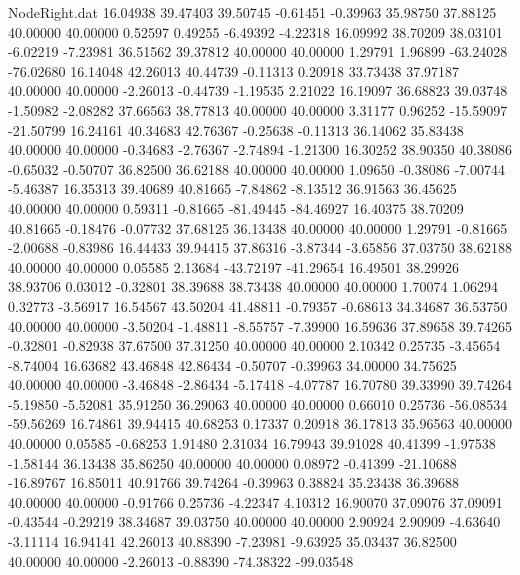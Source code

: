 \begin{filecontents}{NodeRight.dat}
  16.04938   39.47403   39.50745    -0.61451   -0.39963   35.98750   37.88125   40.00000   40.00000    0.52597    0.49255   -6.49392   -4.22318
  16.09992   38.70209   38.03101    -6.02219   -7.23981   36.51562   39.37812   40.00000   40.00000    1.29791    1.96899  -63.24028  -76.02680
  16.14048   42.26013   40.44739    -0.11313    0.20918   33.73438   37.97187   40.00000   40.00000   -2.26013   -0.44739   -1.19535    2.21022
  16.19097   36.68823   39.03748    -1.50982   -2.08282   37.66563   38.77813   40.00000   40.00000    3.31177    0.96252  -15.59097  -21.50799
  16.24161   40.34683   42.76367    -0.25638   -0.11313   36.14062   35.83438   40.00000   40.00000   -0.34683   -2.76367   -2.74894   -1.21300
  16.30252   38.90350   40.38086    -0.65032   -0.50707   36.82500   36.62188   40.00000   40.00000    1.09650   -0.38086   -7.00744   -5.46387
  16.35313   39.40689   40.81665    -7.84862   -8.13512   36.91563   36.45625   40.00000   40.00000    0.59311   -0.81665  -81.49445  -84.46927
  16.40375   38.70209   40.81665    -0.18476   -0.07732   37.68125   36.13438   40.00000   40.00000    1.29791   -0.81665   -2.00688   -0.83986
  16.44433   39.94415   37.86316    -3.87344   -3.65856   37.03750   38.62188   40.00000   40.00000    0.05585    2.13684  -43.72197  -41.29654
  16.49501   38.29926   38.93706     0.03012   -0.32801   38.39688   38.73438   40.00000   40.00000    1.70074    1.06294    0.32773   -3.56917
  16.54567   43.50204   41.48811    -0.79357   -0.68613   34.34687   36.53750   40.00000   40.00000   -3.50204   -1.48811   -8.55757   -7.39900
  16.59636   37.89658   39.74265    -0.32801   -0.82938   37.67500   37.31250   40.00000   40.00000    2.10342    0.25735   -3.45654   -8.74004
  16.63682   43.46848   42.86434    -0.50707   -0.39963   34.00000   34.75625   40.00000   40.00000   -3.46848   -2.86434   -5.17418   -4.07787
  16.70780   39.33990   39.74264    -5.19850   -5.52081   35.91250   36.29063   40.00000   40.00000    0.66010    0.25736  -56.08534  -59.56269
  16.74861   39.94415   40.68253     0.17337    0.20918   36.17813   35.96563   40.00000   40.00000    0.05585   -0.68253    1.91480    2.31034
  16.79943   39.91028   40.41399    -1.97538   -1.58144   36.13438   35.86250   40.00000   40.00000    0.08972   -0.41399  -21.10688  -16.89767
  16.85011   40.91766   39.74264    -0.39963    0.38824   35.23438   36.39688   40.00000   40.00000   -0.91766    0.25736   -4.22347    4.10312
  16.90070   37.09076   37.09091    -0.43544   -0.29219   38.34687   39.03750   40.00000   40.00000    2.90924    2.90909   -4.63640   -3.11114
  16.94141   42.26013   40.88390    -7.23981   -9.63925   35.03437   36.82500   40.00000   40.00000   -2.26013   -0.88390  -74.38322  -99.03548

\end{filecontents}
